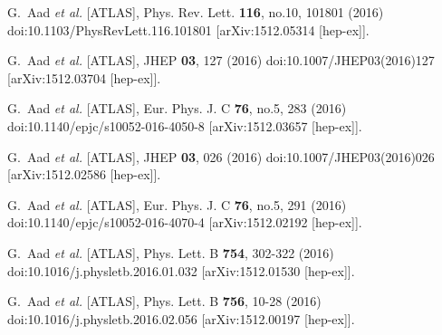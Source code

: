\begin{thebibliography}{9}
G.~Aad \textit{et al.} [ATLAS],
Phys. Rev. Lett. \textbf{116}, no.10, 101801 (2016)
doi:10.1103/PhysRevLett.116.101801
[arXiv:1512.05314 [hep-ex]].

G.~Aad \textit{et al.} [ATLAS],
JHEP \textbf{03}, 127 (2016)
doi:10.1007/JHEP03(2016)127
[arXiv:1512.03704 [hep-ex]].

G.~Aad \textit{et al.} [ATLAS],
Eur. Phys. J. C \textbf{76}, no.5, 283 (2016)
doi:10.1140/epjc/s10052-016-4050-8
[arXiv:1512.03657 [hep-ex]].

G.~Aad \textit{et al.} [ATLAS],
JHEP \textbf{03}, 026 (2016)
doi:10.1007/JHEP03(2016)026
[arXiv:1512.02586 [hep-ex]].

G.~Aad \textit{et al.} [ATLAS],
Eur. Phys. J. C \textbf{76}, no.5, 291 (2016)
doi:10.1140/epjc/s10052-016-4070-4
[arXiv:1512.02192 [hep-ex]].

G.~Aad \textit{et al.} [ATLAS],
Phys. Lett. B \textbf{754}, 302-322 (2016)
doi:10.1016/j.physletb.2016.01.032
[arXiv:1512.01530 [hep-ex]].

G.~Aad \textit{et al.} [ATLAS],
Phys. Lett. B \textbf{756}, 10-28 (2016)
doi:10.1016/j.physletb.2016.02.056
[arXiv:1512.00197 [hep-ex]].


\end{thebibliography}
